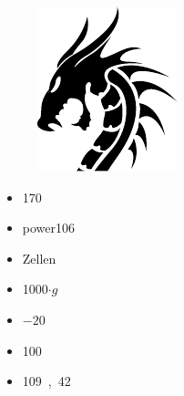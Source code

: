 

\begin{figure}[!htbp]
\begin{center}
\includegraphics[width=\textwidth]{dragonlogo.pdf}
\end{center}
\caption{\label{}}    
\end{figure}


\begin{itemize}
    \item \unit{170}{\cubic\metre}
    \item power{10}{6} 
    \item \unit{Zellen}{\milli\reciprocal\litre} 
    \item \unit{1000}{$\cdot g$} 
    \item \unit{$-20$}{\celsius}
    \item \unit{100}{\micro\gram\milli\reciprocal\litre}
    \item \unit{109,42}{\degree}
\end{itemize}



